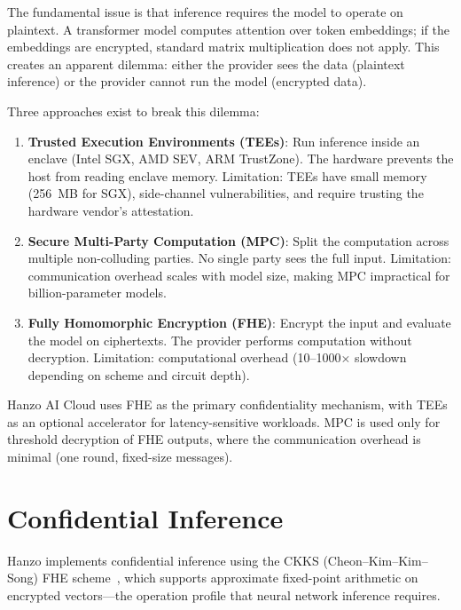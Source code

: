 \documentclass[11pt]{article}
\begin{document}
The fundamental issue is that inference requires the model to operate on
plaintext. A transformer model computes attention over token embeddings; if
the embeddings are encrypted, standard matrix multiplication does not apply.
This creates an apparent dilemma: either the provider sees the data (plaintext
inference) or the provider cannot run the model (encrypted data).

Three approaches exist to break this dilemma:

\begin{enumerate}[leftmargin=1.4em]
    \item \textbf{Trusted Execution Environments (TEEs)}: Run inference inside
    an enclave (Intel SGX, AMD SEV, ARM TrustZone). The hardware prevents the
    host from reading enclave memory. Limitation: TEEs have small memory
    (256~MB for SGX), side-channel vulnerabilities, and require trusting the
    hardware vendor's attestation.
    \item \textbf{Secure Multi-Party Computation (MPC)}: Split the computation
    across multiple non-colluding parties. No single party sees the full
    input. Limitation: communication overhead scales with model size,
    making MPC impractical for billion-parameter models.
    \item \textbf{Fully Homomorphic Encryption (FHE)}: Encrypt the input and
    evaluate the model on ciphertexts. The provider performs computation
    without decryption. Limitation: computational overhead (10--1000$\times$
    slowdown depending on scheme and circuit depth).
\end{enumerate}

Hanzo AI Cloud uses FHE as the primary confidentiality mechanism, with TEEs as
an optional accelerator for latency-sensitive workloads. MPC is used only for
threshold decryption of FHE outputs, where the communication overhead is
minimal (one round, fixed-size messages).

\section{Confidential Inference}
\label{sec:fhe}

Hanzo implements confidential inference using the CKKS (Cheon--Kim--Kim--Song)
FHE scheme~\cite{ckks2017}, which supports approximate fixed-point arithmetic
on encrypted vectors---the operation profile that neural network inference
requires.
\end{document}
